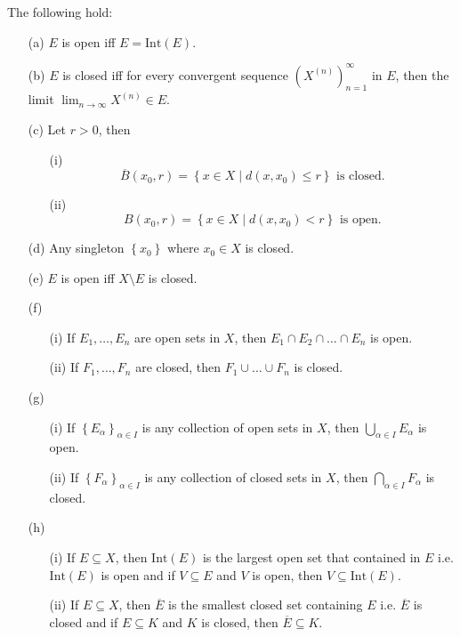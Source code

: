 \begin{proposition} \label{prop: many properties of open and closed set}
    The following hold: 
    \begin{itemize}
        \item [(a)] \(E\) is open iff \(E = \mathrm{Int}(E) \). 
        \item [(b)] \(E\) is closed iff for every convergent sequence \(\left( X^{(n)} \right)_{n=1}^{\infty}  \) in \(E\), then the limit \(\lim_{n \to \infty} X^{(n)} \in E\). 
        \item [(c)] Let \(r > 0\), then 
        \begin{itemize}
            \item [(i)]         \[
            \overline{B}(x_0, r) = \left\{ x \in X \mid d(x, x_0) \le r \right\}  \text{ is closed.}
        \]
            \item [(ii)]        \[
            B(x_0, r) = \left\{ x \in X \mid d(x, x_0) < r \right\} \text{ is open.}
        \]
        \end{itemize}

        \item [(d)] Any singleton \(\left\{ x_0 \right\} \) where \(x_0 \in X\) is closed. 
        \item [(e)] \(E\) is open iff \(X\setminus E\) is closed. 
        \item [(f)]
        \begin{itemize}
            \item [(i)]
        If \(E_1, \dots , E_n\) are open sets in \(X\), then \(E_1 \cap E_2 \cap \dots \cap E_n\) is open.
            \item [(ii)] If \(F_1, \dots , F_n\) are closed, then \(F_1 \cup \dots \cup F_n\) is closed. 
        \end{itemize}
        \item [(g)]
        \begin{itemize}
            \item [(i)] If \(\left\{ E_\alpha  \right\}_{\alpha  \in I} \) is any collection of open sets in \(X\), then \(\bigcup_{\alpha \in I} E_\alpha  \) is open.
            \item [(ii)] If \(\left\{ F_\alpha  \right\}_{\alpha \in I} \) is any collection of closed sets in \(X\), then \(\bigcap_{\alpha  \in I} F_\alpha  \) is closed. 
        \end{itemize}
        \item [(h)] 
        \begin{itemize}
            \item [(i)] If \(E \subseteq X\), then \(\mathrm{Int}(E) \) is the largest open set that contained in \(E\) i.e. \(\mathrm{Int}(E) \) is open and if \(V \subseteq E\) and \(V\) is open, then \(V \subseteq \mathrm{Int}(E) \).
            \item [(ii)] If \(E \subseteq X\), then \(\overline{E} \) is the smallest closed set containing \(E\) i.e. \(\overline{E} \) is closed and if \(E \subseteq K\) and \(K\) is closed, then \(\overline{E} \subseteq K\). 
        \end{itemize}                   
    \end{itemize}
\end{proposition}
